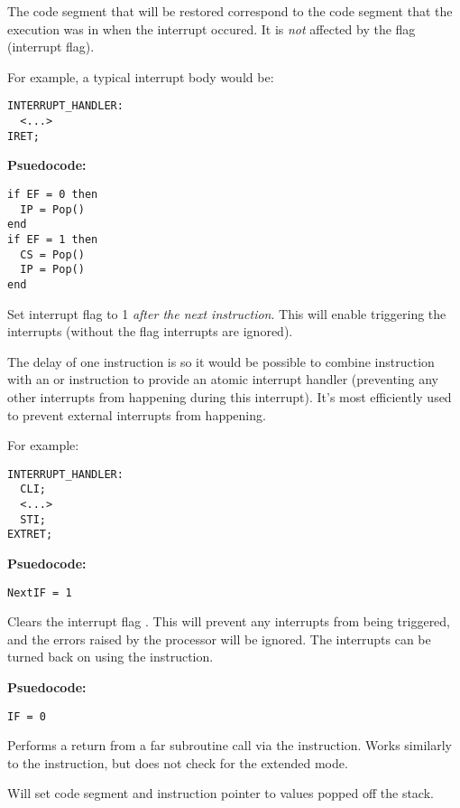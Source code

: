 The code segment that will be restored correspond to the code segment that the execution was in when the interrupt occured. It is \emph{not} affected by the  flag (interrupt flag).

For example, a typical interrupt body would be:
\begin{verbatim}
INTERRUPT_HANDLER:
  <...>
IRET;
\end{verbatim}

\textbf{Psuedocode:}
\begin{verbatim}
if EF = 0 then
  IP = Pop()
end
if EF = 1 then
  CS = Pop()
  IP = Pop()
end
\end{verbatim}


Set interrupt flag  to 1 \emph{after the next instruction}. This will enable triggering the interrupts (without the  flag interrupts are ignored).

The delay of one instruction is so it would be possible to combine  instruction with an  or  instruction to provide an atomic interrupt handler (preventing any other interrupts from happening during this interrupt). It's most efficiently used to prevent external interrupts from happening.

For example:
\begin{verbatim}
INTERRUPT_HANDLER:
  CLI;
  <...>
  STI;
EXTRET;
\end{verbatim}

\intrpriv

\textbf{Psuedocode:}
\begin{verbatim}
NextIF = 1
\end{verbatim}


Clears the interrupt flag . This will prevent any interrupts from being triggered, and the errors raised by the processor will be ignored. The interrupts can be turned back on using the  instruction.

\intrpriv

\textbf{Psuedocode:}
\begin{verbatim}
IF = 0
\end{verbatim}


Performs a return from a far subroutine call via the  instruction. Works similarly to the  instruction, but does not check for the extended mode.

Will set code segment and instruction pointer to values popped off the stack.

